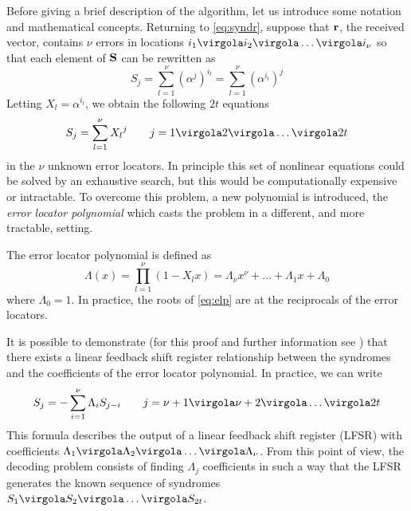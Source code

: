 Before giving a brief description of the algorithm, let us introduce some notation and mathematical concepts. Returning to \eqref{eq:syndr}, suppose that \(\mathbf{r}\), the received vector, contains \(\nu\) errors in locations \( i_1 \virgola i_2 \virgola \ldots \virgola i_{\nu}\) so that each element of \(\mathbf{S}\) can be rewritten as
\begin{equation}
S_j = \sum_{l =1}^{\nu} {{(\alpha^j)}^{i_l}} = \sum_{l =1}^{\nu} {{(\alpha^{i_l})}^j}
\end{equation}
Letting \(X_l = \alpha^{i_l}\), we obtain the following \(2t\) equations
\begin{equation}
S_j = \sum_{l =1}^{\nu} {{X_l}^j} \qquad j = 1\virgola 2\virgola \ldots \virgola 2t
\end{equation}
in the \(\nu\) unknown error locators. In principle this set of nonlinear equations could be solved by an exhaustive search, but this would be computationally expensive or intractable.
To overcome this problem, a new polynomial is introduced, the \emph{error locator polynomial} which casts the problem in a different, and more tractable, setting.

The error locator polynomial is defined as
\begin{equation} \label{eq:elp}
\Lambda(x) = \prod_{l = 1}^{\nu} {(1-X_lx)} = \Lambda_{\nu}x^{\nu} + \ldots +\Lambda_1x + \Lambda_0
\end{equation}
where \(\Lambda_0 = 1\). In practice, the roots of \eqref{eq:elp} are at the reciprocals of the error locators.

It is possible to demonstrate (for this proof and further information see \cite{b:moon}) that there exists a linear feedback shift register relationship between the syndromes and the coefficients of the error locator polynomial. In practice, we can write
\begin{equation} \label{eq:SynLocLFSR}
S_j = - \sum_{i = 1}^{\nu} {\Lambda_i S_{j-i}} \qquad j = \nu+1 \virgola \nu + 2 \virgola \ldots \virgola 2t
\end{equation}
This formula describes the output of a linear feedback shift register (LFSR) with coefficients \(\Lambda_1 \virgola  \Lambda_2 \virgola \ldots \virgola \Lambda_{\nu} \). From this point of view, the decoding problem consists of finding \(\Lambda_j\) coefficients in such a way that the LFSR generates the known sequence of syndromes \(S_1\virgola S_2\virgola \ldots \virgola S_{2t}\).

